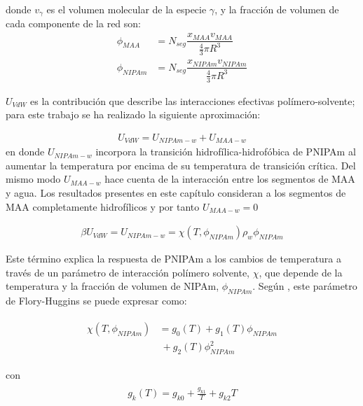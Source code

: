 	
	\noindent donde $v_\gamma$  es el volumen molecular de la especie $\gamma$, y la fracci\'on de volumen de cada componente de la red son: 
	\begin{align}
		\phi_{MAA}&=N_{seg}\dfrac{x_{MAA}v_{MAA}}{\frac{4}{3}\pi R^3}\\
		\phi_{NIPAm}&=N_{seg}\dfrac{x_{NIPAm}v_{NIPAm}}{\frac{4}{3}\pi R^3}
	\end{align}
	
	
	
	$U_{VdW}$ es la contribuci\'on que describe las interacciones efectivas pol\'imero-solvente; para este trabajo  se ha realizado la siguiente aproximaci\'on: 
	
	\begin{align}
		U_{VdW} = U_{NIPAm-w} + U_{MAA-w}
	\end{align}
	\noindent en donde $U_{NIPAm-w}$ incorpora la transici\'on hidrof\'ilica-hidrof\'obica de PNIPAm al aumentar la temperatura por encima de su temperatura de transici\'on cr\'itica. 
	Del mismo modo $U_{MAA-w}$ hace cuenta de la interacci\'on entre los segmentos de MAA y agua.
	Los resultados presentes en este cap\'itulo consideran a los segmentos de MAA completamente hidrof\'ilicos y por tanto $U_{MAA-w} = 0$
	
	\begin{align}
		\beta U_{VdW} = U_{NIPAm-w} = \chi (T, \phi_{NIPAm})\rho_w \phi_{NIPAm}
	\end{align}
	
	
	Este  t\'ermino explica la respuesta de PNIPAm a los cambios de temperatura a trav\'es de un par\'ametro de interacci\'on pol\'imero solvente, $\chi$, que depende de la temperatura y la fracci\'on de volumen de NIPAm, $\phi_{NIPAm}$.
	Seg\'un  \citet{afroze2000}, este par\'ametro de Flory-Huggins se puede expresar como:
	
	
	\begin{align}
		\begin{aligned}
			\chi (T, \phi_{NIPAm}) &=g_0(T) +g_1(T)\phi_{NIPAm} \\
			&~+ g_2(T)\phi_{NIPAm}^2
		\end{aligned}
	\end{align}
	
	\noindent con
	\begin{align}
		\begin{aligned} 
			g_k(T)=g_{k0} + \frac{g_{k1}}{T} + g_{k2}T
		\end{aligned}
	\end{align}
	
